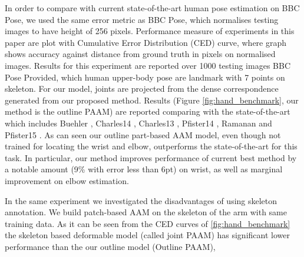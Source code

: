 In order to compare with current state-of-the-art human pose estimation on BBC Pose, we used the same error metric as BBC Pose, which normalises testing images to have height of 256 pixels. Performance measure of experiments in this paper are plot with Cumulative Error Distribution (CED) curve, where graph shows accuracy against distance from ground truth in pixels on normalised images. Results for this experiment are reported over 1000 testing images BBC Pose Provided, which human upper-body pose are landmark with 7 points on skeleton. For our model, joints are projected from the dense correspondence generated from our proposed method. Results (Figure \ref{fig:hand_benchmark}, our method is the outline PAAM) are reported comparing with the state-of-the-art which includes Buehler \cite{buehler2011upper}, Charles14 \cite{charles2014upper}, Charles13 \cite{charles2013domain}, Pfister14 \cite{pfister2015deep}, Ramanan \cite{yang2013articulated} and Pfister15 \cite{pfister2015flowing}. As can seen our outline part-based AAM model, even though not trained for locating the wrist and elbow, outperforms the state-of-the-art for this task. In particular, our method improves performance of current best method \cite{pfister2015flowing} by a notable amount (9\% with error less than 6pt) on wrist, as well as marginal improvement on elbow estimation.

In the same experiment we investigated the disadvantages of using skeleton annotation. We build patch-based AAM on the skeleton of the arm with same training data. As it can be seen from the  CED curves of \ref{fig:hand_benchmark} the skeleton based deformable model (called joint PAAM) has significant lower performance than the our outline model (Outline PAAM),



